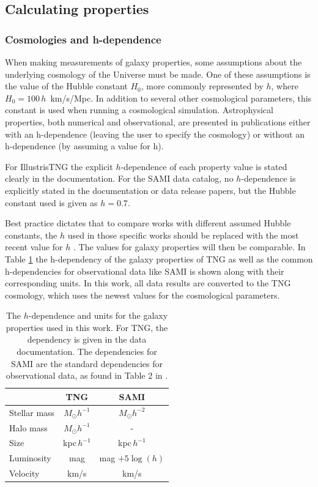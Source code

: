 \subsection{Calculating properties}

\subsubsection{Cosmologies and h-dependence} \label{cosmologies}
When making measurements of galaxy properties, some assumptions about the underlying cosmology of the Universe must be made. One of these assumptions is the value of the Hubble constant $H_0$, more commonly represented by $h$, where $H_0 = 100\,h\,$ km/s/Mpc. In addition to several other cosmological parameters, this constant is used when running a cosmological simulation. Astrophysical properties, both numerical and observational, are presented in publications either with an h-dependence (leaving the user to specify the cosmology) or without an h-dependence (by assuming a value for h).

For IllustrisTNG the explicit $h$-dependence of each property value is stated clearly in the documentation. For the SAMI data catalog, no $h$-dependence is explicitly stated in the documentation or data release papers, but the Hubble constant used is given as $h = 0.7$.

Best practice dictates that to compare works with different assumed Hubble constants, the $h$ used in those specific works should be replaced with the most recent value for $h$ \parencite{Croton2013}. The values for galaxy properties will then be comparable. In Table \ref{h_dependence} the h-dependency of the galaxy properties of TNG as well as the common h-dependencies for observational data like SAMI is shown along with their corresponding units. In this work, all data results are converted to the TNG cosmology, which uses the newest values for the cosmological parameters.

\begin{table}
\begin{center}
\caption{The $h$-dependence and units for the galaxy properties used in this work. For TNG, the dependency is given in the data documentation. The dependencies for SAMI are the standard dependencies for observational data, as found in Table 2 in \textcite{Croton2013}.}
\label{h_dependence}
\begin{tabular}{ l| c c }
 \hline
 \hline
   & TNG & SAMI \\
 \hline
 Stellar mass & $M_{\odot}h^{-1}$ & $M_{\odot}h^{-2}$ \\ 
 Halo mass & $M_{\odot}h^{-1}$ & - \\
 Size & kpc$\,h^{-1}$ & kpc$\,h^{-1}$ \\
 Luminosity & mag & mag $+5\log(h)$ \\
 Velocity & km/s & km/s  \\ 

 \hline 
\end{tabular}
\end{center}
\end{table}

